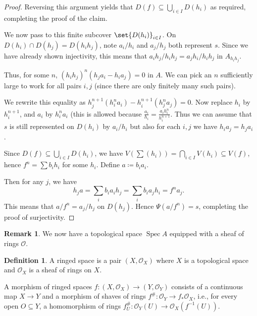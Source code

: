 \documentclass[a4paper]{amsbook}
\theoremstyle{definition}
\newtheorem*{definition*}{Definition}
\newtheorem*{remark*}{Remark}
\DeclareMathOperator\Spec{Spec}
\begin{document}
\begin{proof}[Proof]
Reversing this argument yields that $D(f) \subseteq \bigcup_{i \in I} D(h_i)$ as
required, completing the proof of the claim.

We now pass to this finite subcover $\set{D(h_i)}_{i \in I}$. On
$D(h_i)\cap D(h_j) = D(h_ih_j)$, note $a_i/h_i$ and $a_j/h_j$ both represent $s$. Since we
have already shown injectivity, this means that $a_ih_j/h_ih_j = a_jh_i/h_ih_j$ in $A_{h_ih_j}$.

Thus, for some $n$, $(h_ih_j)^n(h_ja_i - h_ia_j) = 0$ in $A$. We can pick an $n$
sufficiently large to work for all pairs $i, j$ (since there are only finitely many
such pairs).

We rewrite this equality as $h_j^{n+1}(h_i^na_i) - h_i^{n+1}(h_j^na_j) = 0$.
Now replace $h_i$ by $h_i^{n+1}$, and $a_i$ by $h_i^na_i$ (this is allowed because
$\frac{a_i}{h_i}= \frac{a_ih_i^n}{h_i^{n+1}}$. Thus we can assume that $s$ is still
represented on $D(h_i)$ by $a_i/h_i$ but also for each $i, j$ we have $h_ia_j = h_ja_i$.

Since $D(f) \subseteq \bigcup_{i \in I} D(h_i)$, we have
$V(\sum (h_i)) = \bigcap_{i \in I} V(h_i) \subseteq V(f)$, hence
$f^n = \sum b_ih_i$ for some $h_i$. Define $a\coloneqq b_i a_i$.

Then for any $j$, we have \[ h_ja = \sum_i b_ia_ih_j = \sum_i b_ia_jh_i = f^na_j. \]
This means that $a/f^n = a_j/h_j$ on $D(h_j)$. Hence $\Psi(a/f^n) = s$, completing
the proof of surjectivity.
\end{proof}

\begin{remark*}
\label{WhereAreWe}
We now have a topological space $\Spec A$ equipped with a sheaf of rings
$\mathcal{O}$.
\end{remark*}

\begin{definition*}
\label{RingedSpace}
A ringed space is a pair $(X, \mathcal{O}_X)$ where $X$ is a topological space
and $\mathcal{O}_X$ is a sheaf of rings on $X$.

A morphism of ringed spaces $f\colon (X, \mathcal{O}_X) \to (Y, \mathcal{O}_Y)$
consists of a continuous map $X\to Y$ and a morphism of shaves of rings
$f^\#\colon \mathcal{O}_Y\to f_*\mathcal{O}_X$, i.e., for every open $O \subseteq Y$,
a homomorphism of rings $f^\#_U\colon \mathcal{O}_Y(U)\to \mathcal{O}_X(f^{-1}(U))$.
\end{definition*}
\end{document}
